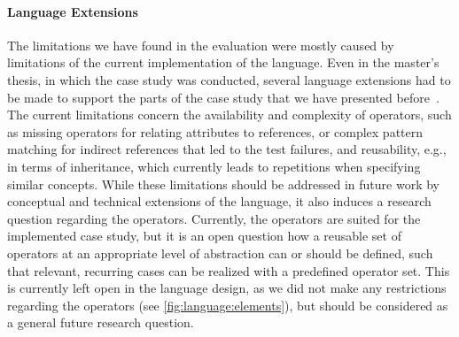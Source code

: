 \paragraph{Language Extensions}
The limitations we have found in the evaluation were mostly caused by limitations of the current implementation of the \commonalities language.
Even in the master's thesis, in which the case study was conducted, several language extensions had to be made to support the parts of the case study that we have presented before~.
The current limitations concern the availability and complexity of operators, such as missing operators for relating attributes to references, or complex pattern matching for indirect references that led to the test failures, and reusability, e.g., in terms of inheritance, which currently leads to repetitions when specifying similar concepts.
While these limitations should be addressed in future work by conceptual and technical extensions of the \commonalities language, it also induces a research question regarding the operators.
Currently, the operators are suited for the implemented case study, but it is an open question how a reusable set of operators at an appropriate level of abstraction can or should be defined, such that relevant, recurring cases can be realized with a predefined operator set.
This is currently left open in the language design, as we did not make any restrictions regarding the operators (see \autoref{fig:language:elements}), but should be considered as a general future research question.



